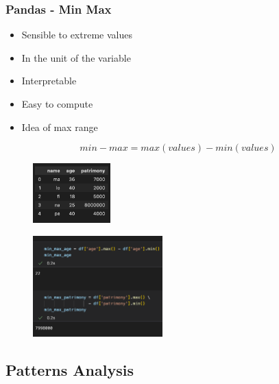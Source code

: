 \begin{frame}\frametitle{Pandas - Min Max}
   \begin{minipage}{0.58\linewidth}
      \begin{itemize}
         \item Sensible to extreme values
         \item In the unit of the variable
         \item Interpretable
         \item Easy to compute
         \item Idea of max range
      \end{itemize}
      \vspace{.5cm}
      $$min-max = max(values) - min(values)$$
      \begin{figure}[H]
         \includegraphics[width=3cm]{../images/illustrations/data_analysis_df_2.png}
      \end{figure}
   \end{minipage}
   \begin{minipage}{0.38\linewidth}
      \begin{figure}[H]
         \includegraphics[width=5cm]{../images/illustrations/min_max.png}
      \end{figure}
   \end{minipage}
\end{frame}



\subsection{Patterns Analysis}


